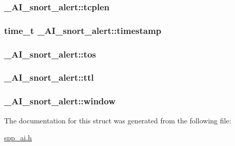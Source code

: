 \label{struct__AI__snort__alert_aa643f11db93b70242b57f0a04775e507}
\hypertarget{struct__AI__snort__alert_a519a103f5e8f1cb006c0c137b7c6a1c0}{
\subsubsection[{tcplen}]{ {\bf \_\-AI\_\-snort\_\-alert::tcplen}}}
\label{struct__AI__snort__alert_a519a103f5e8f1cb006c0c137b7c6a1c0}
\hypertarget{struct__AI__snort__alert_a10a67f60ca3da339a2104849a0b2ac19}{
\subsubsection[{timestamp}]{\setlength{\rightskip}{0pt plus 5cm}time\_\-t {\bf \_\-AI\_\-snort\_\-alert::timestamp}}}
\label{struct__AI__snort__alert_a10a67f60ca3da339a2104849a0b2ac19}
\hypertarget{struct__AI__snort__alert_a882ae6db43dc0fe08071947ccb044b93}{
\subsubsection[{tos}]{ {\bf \_\-AI\_\-snort\_\-alert::tos}}}
\label{struct__AI__snort__alert_a882ae6db43dc0fe08071947ccb044b93}
\hypertarget{struct__AI__snort__alert_ab9b1ce8ee440a324af116403ac9c51a2}{
\subsubsection[{ttl}]{ {\bf \_\-AI\_\-snort\_\-alert::ttl}}}
\label{struct__AI__snort__alert_ab9b1ce8ee440a324af116403ac9c51a2}
\hypertarget{struct__AI__snort__alert_a63e94be3d248cf4beb0d4d5ab75331b1}{
\subsubsection[{window}]{ {\bf \_\-AI\_\-snort\_\-alert::window}}}
\label{struct__AI__snort__alert_a63e94be3d248cf4beb0d4d5ab75331b1}


The documentation for this struct was generated from the following file:\begin{DoxyCompactItemize}
\item 
\hyperlink{spp__ai_8h}{spp\_\-ai.h}\end{DoxyCompactItemize}
